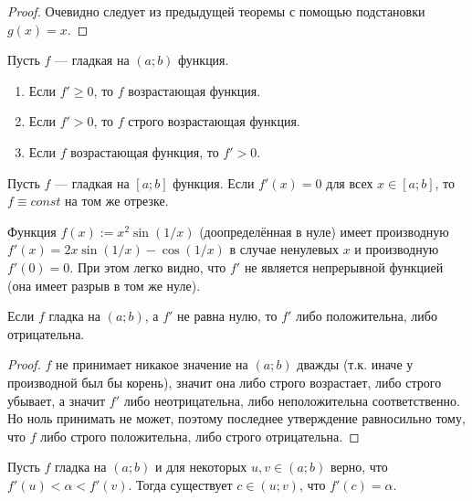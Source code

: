 \documentclass[12pt,a4paper]{article}
\begin{document}
    \begin{proof}
        Очевидно следует из предыдущей теоремы с помощью подстановки $g(x) = x$.
    \end{proof}

    \begin{theorem}
        Пусть $f$ --- гладкая на $(a; b)$ функция.
        \begin{enumerate}
            \item Если $f' \geqslant 0$, то $f$ возрастающая функция.
            \item Если $f' > 0$, то $f$ строго возрастающая функция.
            \item Если $f$ возрастающая функция, то $f' > 0$.
        \end{enumerate}
    \end{theorem}

    \begin{theorem}
        Пусть $f$ --- гладкая на $[a; b]$ функция. Если $f'(x) = 0$ для всех $x \in [a; b]$, то $f \equiv const$ на том же отрезке.
    \end{theorem}

    \begin{remark}
        Функция $f(x) := x^2 \sin(1/x)$ (доопределённая в нуле) имеет производную $f'(x) = 2x\sin(1/x) - \cos(1/x)$ в случае ненулевых $x$ и производную $f'(0) = 0$. При этом легко видно, что $f'$ не является непрерывной функцией (она имеет разрыв в том же нуле).
    \end{remark}

    \begin{theorem}
        Если $f$ гладка на $(a; b)$, а $f'$ не равна нулю, то $f'$ либо положительна, либо отрицательна.
    \end{theorem}

    \begin{proof}
        $f$ не принимает никакое значение на $(a; b)$ дважды (т.к. иначе у производной был бы корень), значит она либо строго возрастает, либо строго убывает, а значит $f'$ либо неотрицательна, либо неположительна соответственно. Но ноль принимать не может, поэтому последнее утверждение равносильно тому, что $f$ либо строго положительна, либо строго отрицательна.
    \end{proof}

    \begin{theorem}
        Пусть $f$ гладка на $(a; b)$ и для некоторых $u, v \in (a; b)$ верно, что $f'(u) < \alpha < f'(v)$. Тогда существует $c \in (u; v)$, что $f'(c) = \alpha$.
    \end{theorem}
\end{document}
